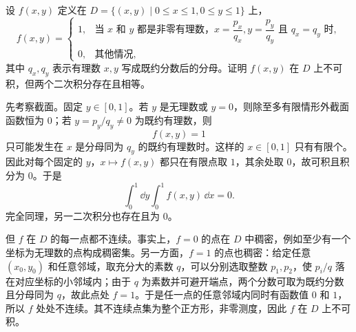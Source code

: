 \begin{xreferenceproblem}[2]
设 $f(x,y)$ 定义在 $D=\{(x,y)\mid0\le x\le1,0\le y\le1\}$ 上，
  \[
    f(x,y)=
    \begin{cases}
      1, & \text{当 }x\text{ 和 }y\text{ 都是非零有理数，}x=\dfrac{p_x}{q_x},y=\dfrac{p_y}{q_y}\text{ 且 }q_x=q_y\text{ 时},\\
      0, & \text{其他情况},
    \end{cases}
  \]
  其中 $q_x,q_y$ 表示有理数 $x,y$ 写成既约分数后的分母。证明 $f(x,y)$ 在 $D$ 上不可积，但两个二次积分存在且相等。
\end{xreferenceproblem}
\begin{xsolution}
先考察截面。固定 $y\in[0,1]$。若 $y$ 是无理数或 $y=0$，则除至多有限情形外截面函数恒为 $0$；若 $y=p_y/q_y\ne0$ 为既约有理数，则
\[
  f(x,y)=1
\]
只可能发生在 $x$ 是分母同为 $q_y$ 的既约有理数时。这样的 $x\in[0,1]$ 只有有限个。因此对每个固定的 $y$，$x\mapsto f(x,y)$ 都只在有限点取 $1$，其余处取 $0$，故可积且积分为 $0$。于是
\[
  \int_0^1\dd y\int_0^1f(x,y)\,\dd x=0.
\]
完全同理，另一二次积分也存在且为 $0$。

但 $f$ 在 $D$ 的每一点都不连续。事实上，$f=0$ 的点在 $D$ 中稠密，例如至少有一个坐标为无理数的点构成稠密集。另一方面，$f=1$ 的点也稠密：给定任意 $(x_0,y_0)$ 和任意邻域，取充分大的素数 $q$，可以分别选取整数 $p_1,p_2$，使 $p_i/q$ 落在对应坐标的小邻域内；由于 $q$ 为素数并可避开端点，两个分数可取为既约分数且分母同为 $q$，故此点处 $f=1$。于是任一点的任意邻域内同时有函数值 $0$ 和 $1$，所以 $f$ 处处不连续。其不连续点集为整个正方形，非零测度，因此 $f$ 在 $D$ 上不可积。
\end{xsolution}


